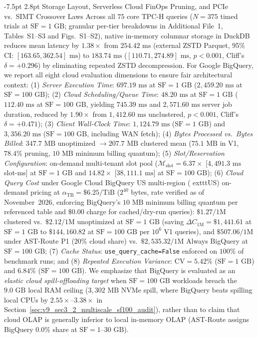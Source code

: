 \documentclass[10pt,a4paper]{article}
\makeatletter
\renewcommand\subsection{\@startsection{subsection}{2}{\z@}%
  {-7.5pt \@plus -2pt \@minus -1pt}%
  {2.8pt \@plus 1pt}%
  {\normalfont\normalsize\bfseries}}
\makeatother
\begin{document}
\subsection{Storage Layout, Serverless Cloud FinOps Pruning, and PCIe vs.\ SIMT Crossover Laws}
Across all $75$ core TPC-H queries ($N=375$ timed trials at $\text{SF}=1\text{ GB}$; granular per-tier breakdowns in Additional File~1, Tables~S1--S3 and Figs.~S1--S2), native in-memory columnar storage in DuckDB reduces mean latency by $1.38\times$ from $254.42\text{ ms}$ (external ZSTD Parquet, 95\% CI: $[163.65, 362.54]\text{ ms}$) to $183.74\text{ ms}$ ($[110.71, 274.89]\text{ ms}$, $p < 0.001$, Cliff's $\delta = +0.296$) by eliminating repeated ZSTD decompression. For Google BigQuery, we report all eight cloud evaluation dimensions to ensure fair architectural context: (1) \emph{Server Execution Time}: $697.19\text{ ms}$ at $\text{SF}=1\text{ GB}$ ($2{,}459.20\text{ ms}$ at $\text{SF}=100\text{ GB}$); (2) \emph{Cloud Scheduling/Queue Time}: $48.20\text{ ms}$ at $\text{SF}=1\text{ GB}$ ($112.40\text{ ms}$ at $\text{SF}=100\text{ GB}$, yielding $745.39\text{ ms}$ and $2{,}571.60\text{ ms}$ server job duration, reduced by $1.90\times$ from $1{,}412.60\text{ ms}$ unclustered, $p < 0.001$, Cliff's $\delta = +0.471$); (3) \emph{Client Wall-Clock Time}: $1{,}124.79\text{ ms}$ ($\text{SF}=1\text{ GB}$) and $3{,}356.20\text{ ms}$ ($\text{SF}=100\text{ GB}$, including WAN fetch); (4) \emph{Bytes Processed vs.\ Bytes Billed}: $347.7\text{ MB}$ unoptimized $\rightarrow 207.7\text{ MB}$ clustered mean ($75.1\text{ MB}$ in V1, $78.4\%$ pruning, $10\text{ MB}$ minimum billing quantum); (5) \emph{Slot/Reservation Configuration}: on-demand multi-tenant slot pool ($\mathcal{M}_{\text{slot}} = 6.37\times$ [$4{,}491.3\text{ ms}$ slot-ms] at $\text{SF}=1\text{ GB}$ and $14.82\times$ [$38{,}111.1\text{ ms}$] at $\text{SF}=100\text{ GB}$); (6) \emph{Cloud Query Cost} under Google Cloud BigQuery US multi-region (	exttt{US}) on-demand pricing at $\alpha_{\text{TB}} = \$6.25/\text{TiB}$ ($2^{40}$ bytes, rate verified as of November~2026, enforcing BigQuery's $10\text{ MB}$ minimum billing quantum per referenced table and $\$0.00$ charge for cached/dry-run queries): $\$1.27/1\text{M}$ clustered vs.\ $\$2.12/1\text{M}$ unoptimized at $\text{SF}=1\text{ GB}$ (saving $\Delta C_{\text{1M}}=\$1{,}441.61$ at $\text{SF}=1\text{ GB}$ to $\$144{,}160.82$ at $\text{SF}=100\text{ GB}$ per $10^6$ V1 queries), and $\$507.06/1\text{M}$ under AST-Route P1 ($20\%$ cloud share) vs.\ $\$2{,}535.32/1\text{M}$ Always BigQuery at $\text{SF}=100\text{ GB}$; (7) \emph{Cache Status}: \texttt{use\_query\_cache=False} enforced on $100\%$ of benchmark runs; and (8) \emph{Repeated Execution Variance}: $\text{CV}=5.42\%$ ($\text{SF}=1\text{ GB}$) and $6.84\%$ ($\text{SF}=100\text{ GB}$). We emphasize that BigQuery is evaluated as an \emph{elastic cloud spill-offloading target} when $\text{SF}=100\text{ GB}$ workloads breach the $9.0\text{ GB}$ local RAM ceiling ($3{,}302\text{ MB}$ NVMe spill, where BigQuery beats spilling local CPUs by $\mathbf{2.55\times\text{--}3.38\times}$ in Section~\ref{sec:v9_sec3_2_multiscale_sf100_audit}), rather than to claim that cloud OLAP is generally inferior to local in-memory OLAP (AST-Route assigns BigQuery $0.0\%$ share at $\text{SF}=1\text{--}30\text{ GB}$).
\end{document}
